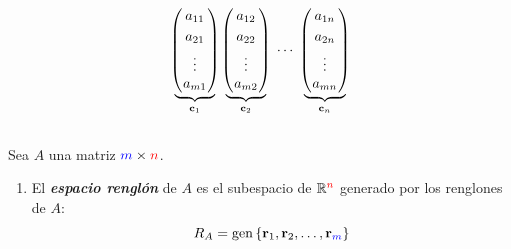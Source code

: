 {\begin{frame}
\begin{columns}[c]
\begin{column}{1.15\textwidth}
\[\begin{array}{@{\hspace{0.1\tabcolsep}}c@{\hspace{2\tabcolsep}}c@{\hspace{2\tabcolsep}}c@{\hspace{0.1\tabcolsep}}}
\begin{array}{@{\hspace{0.1\tabcolsep}}c@{\hspace{0.5\tabcolsep}}c@{\hspace{0.5\tabcolsep}}l@{\hspace{0.1\tabcolsep}}}
			\end{array}
			& 
			{
				\begin{array}{@{\hspace{0.1\tabcolsep}}c@{\hspace{1.3\tabcolsep}}c@{\hspace{1.3\tabcolsep}}c@{\hspace{1.3\tabcolsep}}c@{\hspace{0.1\tabcolsep}}}\\[8mm]
				\underbrace{\!\!
					\left(
					\begin{array}{@{\hspace{0.1\tabcolsep}}c@{\hspace{0.1\tabcolsep}}}
					a_{11}\\[1mm]
					a_{21}\\[1mm]
					\vdots \\[0mm]
					a_{m1}
					\end{array}
					\right)
					\!\!}_{\mathbf{c}_1}
				& 
				\underbrace{\!\!
					\left(
					\begin{array}{@{\hspace{0.1\tabcolsep}}c@{\hspace{0.1\tabcolsep}}}
					a_{12}\\[1mm]
					a_{22}\\[1mm]
					\vdots \\[0mm]
					a_{m2}
					\end{array}
					\right)
					\!\!}_{\mathbf{c}_2}
				& 
				\cdots
				& 
				\underbrace{\!\!
					\left(
					\begin{array}{@{\hspace{0.1\tabcolsep}}c@{\hspace{0.1\tabcolsep}}}
					a_{1n}\\[1mm]
					a_{2n}\\[1mm]
					\vdots \\[0mm]
					a_{mn}
					\end{array}
					\right)
					\!\!}_{\mathbf{c}_n}
				\end{array}
				\atop
			}				
			\end{array}		
			\]
		\end{column}
	\end{columns}
	
	\vspace{-4mm}
	
	
	\begin{defi}{}
		Sea $A$ una matriz ${\color{blue}m}\times {\color{red}n}$.
		\begin{enumerate}
			\item[\labelname{$a$}] El \textbf{\textit{espacio renglón}} de $A$ es el subespacio de $\mathbb{R}^{\color{red}n}$ generado por los renglones de $A$:
			\[
			R_A = \text{gen}\, \{ \mathbf{r}_1, \mathbf{r}_2, \hdots,\mathbf{r}_{\color{blue}m} \}
			\]
			

\end{enumerate}
\end{defi}
\end{frame}}
